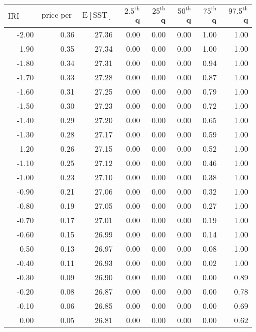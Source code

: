 \begin{table*}[ht]
\centering \footnotesize
\begin{tabular}{rrrrrrrr}
  \hline
$\mbox{IRI anom}$ & $\mbox{price per USD}$ & $\mbox{E}[\mbox{SST}]$ & $2.5^{\mbox{th}}$ q & $25^{\mbox{th}}$ q & $50^{\mbox{th}}$ q & $75^{\mbox{th}}$ q & $97.5^{\mbox{th}}$ q \\ 
  \hline
-2.00 & 0.36 & 27.36 & 0.00 & 0.00 & 0.00 & 1.00 & 1.00 \\ 
  -1.90 & 0.35 & 27.34 & 0.00 & 0.00 & 0.00 & 1.00 & 1.00 \\ 
  -1.80 & 0.34 & 27.31 & 0.00 & 0.00 & 0.00 & 0.94 & 1.00 \\ 
  -1.70 & 0.33 & 27.28 & 0.00 & 0.00 & 0.00 & 0.87 & 1.00 \\ 
  -1.60 & 0.31 & 27.25 & 0.00 & 0.00 & 0.00 & 0.79 & 1.00 \\ 
  -1.50 & 0.30 & 27.23 & 0.00 & 0.00 & 0.00 & 0.72 & 1.00 \\ 
  -1.40 & 0.29 & 27.20 & 0.00 & 0.00 & 0.00 & 0.65 & 1.00 \\ 
  -1.30 & 0.28 & 27.17 & 0.00 & 0.00 & 0.00 & 0.59 & 1.00 \\ 
  -1.20 & 0.26 & 27.15 & 0.00 & 0.00 & 0.00 & 0.52 & 1.00 \\ 
  -1.10 & 0.25 & 27.12 & 0.00 & 0.00 & 0.00 & 0.46 & 1.00 \\ 
  -1.00 & 0.23 & 27.10 & 0.00 & 0.00 & 0.00 & 0.38 & 1.00 \\ 
  -0.90 & 0.21 & 27.06 & 0.00 & 0.00 & 0.00 & 0.32 & 1.00 \\ 
  -0.80 & 0.19 & 27.05 & 0.00 & 0.00 & 0.00 & 0.27 & 1.00 \\ 
  -0.70 & 0.17 & 27.01 & 0.00 & 0.00 & 0.00 & 0.19 & 1.00 \\ 
  -0.60 & 0.15 & 26.99 & 0.00 & 0.00 & 0.00 & 0.14 & 1.00 \\ 
  -0.50 & 0.13 & 26.97 & 0.00 & 0.00 & 0.00 & 0.08 & 1.00 \\ 
  -0.40 & 0.11 & 26.93 & 0.00 & 0.00 & 0.00 & 0.02 & 1.00 \\ 
  -0.30 & 0.09 & 26.90 & 0.00 & 0.00 & 0.00 & 0.00 & 0.89 \\ 
  -0.20 & 0.08 & 26.87 & 0.00 & 0.00 & 0.00 & 0.00 & 0.78 \\ 
  -0.10 & 0.06 & 26.85 & 0.00 & 0.00 & 0.00 & 0.00 & 0.69 \\ 
  0.00 & 0.05 & 26.81 & 0.00 & 0.00 & 0.00 & 0.00 & 0.62 \\ 

\end{tabular}
\end{table*}
